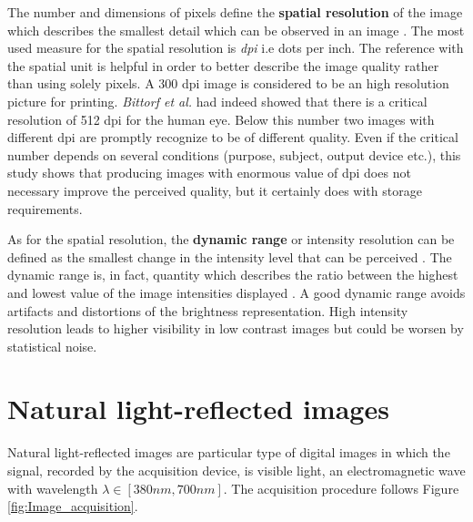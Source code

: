 \documentclass[../main.tex]{subfiles}
\begin{document}
The number and dimensions of pixels define the \textbf{spatial resolution} of the image which describes the smallest detail which can be observed in an image \cite{digital_image_processing_gonzales}.
The most used measure for the spatial resolution is \textit{dpi} i.e dots per inch. The reference with the spatial unit is helpful in order to better describe the image quality rather than using solely pixels.
A 300 dpi image is considered to be an high resolution picture for printing. \textit{Bittorf et al.} \cite{resolution_requirements} had indeed showed that there is a critical resolution of 512 dpi for the human eye. 
Below this number two images with different dpi are promptly recognize to be of different quality. Even if the critical number depends on several conditions (purpose, subject, output device etc.), this study shows that producing images with enormous value of dpi does not necessary improve the perceived quality, but it certainly does with storage requirements.
 
As for the spatial resolution, the \textbf{dynamic range} or intensity resolution can be defined as the smallest change in the intensity level that can be perceived \cite{digital_image_processing_gonzales}.
The dynamic range is, in fact, quantity which describes the ratio between the highest and lowest value of the image intensities displayed \cite{dynamic_range}.
A good dynamic range avoids artifacts and distortions of the brightness representation. 
High intensity resolution leads to higher visibility in low contrast images but could be worsen by statistical noise.

\section{Natural light-reflected images}

Natural light-reflected images are particular type of digital images in which the signal, recorded by the acquisition device, is visible light, an electromagnetic wave with wavelength $\lambda \in [380nm, 700nm]$.
The acquisition procedure follows Figure \ref{fig:Image_acquisition}.
\end{document}
